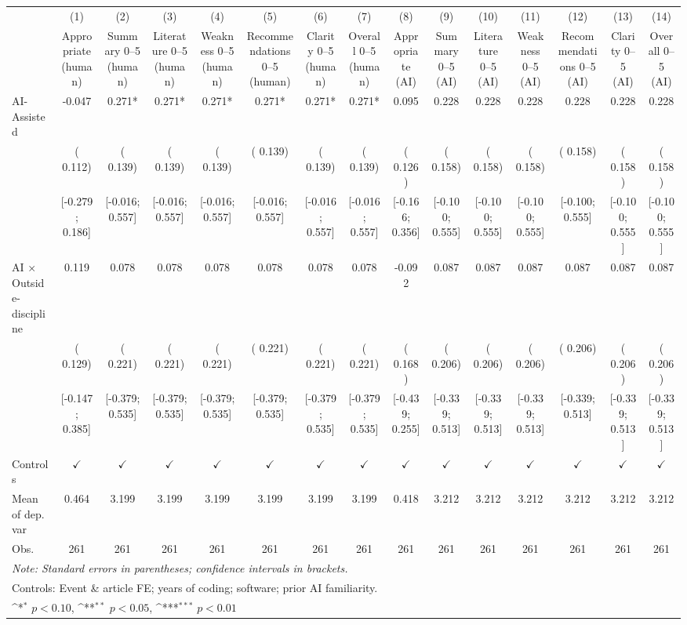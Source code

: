 \def\sym#1{\ifmmode^{#1}\else\(^{#1}\)\fi}
\begin{tabular}{l*{14}{c}}
\hline\hline
 & (1) & (2) & (3) & (4) & (5) & (6) & (7) & (8) & (9) & (10) & (11) & (12) & (13) & (14)
\\
 & Appropriate (human) & Summary 0–5 (human) & Literature 0–5 (human) & Weakness 0–5 (human) & Recommendations 0–5 (human) & Clarity 0–5 (human) & Overall 0–5 (human) & Appropriate (AI) & Summary 0–5 (AI) & Literature 0–5 (AI) & Weakness 0–5 (AI) & Recommendations 0–5 (AI) & Clarity 0–5 (AI) & Overall 0–5 (AI)
 \\
\hline
AI-Assisted & -0.047 &  0.271* &  0.271* &  0.271* &  0.271* &  0.271* &  0.271* &  0.095 &  0.228 &  0.228 &  0.228 &  0.228 &  0.228 &  0.228
\\
 & ( 0.112) & ( 0.139) & ( 0.139) & ( 0.139) & ( 0.139) & ( 0.139) & ( 0.139) & ( 0.126) & ( 0.158) & ( 0.158) & ( 0.158) & ( 0.158) & ( 0.158) & ( 0.158)
\\
 & [-0.279;  0.186] & [-0.016;  0.557] & [-0.016;  0.557] & [-0.016;  0.557] & [-0.016;  0.557] & [-0.016;  0.557] & [-0.016;  0.557] & [-0.166;  0.356] & [-0.100;  0.555] & [-0.100;  0.555] & [-0.100;  0.555] & [-0.100;  0.555] & [-0.100;  0.555] & [-0.100;  0.555]
\\
AI × Outside-discipline &  0.119 &  0.078 &  0.078 &  0.078 &  0.078 &  0.078 &  0.078 & -0.092 &  0.087 &  0.087 &  0.087 &  0.087 &  0.087 &  0.087
\\
 & ( 0.129) & ( 0.221) & ( 0.221) & ( 0.221) & ( 0.221) & ( 0.221) & ( 0.221) & ( 0.168) & ( 0.206) & ( 0.206) & ( 0.206) & ( 0.206) & ( 0.206) & ( 0.206)
\\
 & [-0.147;  0.385] & [-0.379;  0.535] & [-0.379;  0.535] & [-0.379;  0.535] & [-0.379;  0.535] & [-0.379;  0.535] & [-0.379;  0.535] & [-0.439;  0.255] & [-0.339;  0.513] & [-0.339;  0.513] & [-0.339;  0.513] & [-0.339;  0.513] & [-0.339;  0.513] & [-0.339;  0.513]
\\
\hline
Controls & $\checkmark$ & $\checkmark$ & $\checkmark$ & $\checkmark$ & $\checkmark$ & $\checkmark$ & $\checkmark$ & $\checkmark$ & $\checkmark$ & $\checkmark$ & $\checkmark$ & $\checkmark$ & $\checkmark$ & $\checkmark$
\\
Mean of dep. var &  0.464 &  3.199 &  3.199 &  3.199 &  3.199 &  3.199 &  3.199 &  0.418 &  3.212 &  3.212 &  3.212 &  3.212 &  3.212 &  3.212
\\
Obs. & 261 & 261 & 261 & 261 & 261 & 261 & 261 & 261 & 261 & 261 & 261 & 261 & 261 & 261
\\
\hline
\hline\hline
\multicolumn{15}{l}{\it{Note:} Standard errors in parentheses; confidence intervals in brackets.}\\
\multicolumn{15}{l}{Controls: Event \& article FE; years of coding; software; prior AI familiarity.}\\
\multicolumn{15}{l}{\sym{*} $p<0.10$, \sym{**} $p<0.05$,  \sym{***} $p<0.01$}\\
\end{tabular}
